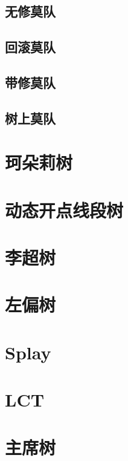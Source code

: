 \documentclass{probook}
\begin{document}
\subsection{无修莫队} 

\subsection{回滚莫队} 

\subsection{带修莫队} 

\subsection{树上莫队} 

\section{珂朵莉树}

\section{动态开点线段树}

\section{李超树}

\section{左偏树}

\section{Splay}

\section{LCT}

\section{主席树}
\end{document}
